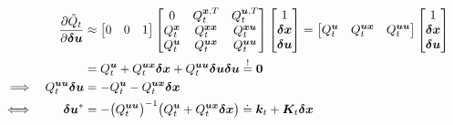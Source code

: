 			\begin{align}
				                  &           & \pdv{\tilde{Q}_t}{\bm{\delta u}}
				                  & \approx
				\begin{bmatrix}
					0 & 0 & 1
				\end{bmatrix}
				\begin{bmatrix}
					0             & Q_t^{\bm{x}, T}      & Q_t^{\bm{u}, T}      \\
					Q_t^{\bm{x}} & Q_t^{\bm{x} \bm{x}} & Q_t^{\bm{x} \bm{u}} \\
					Q_t^{\bm{u}} & Q_t^{\bm{u} \bm{x}} & Q_t^{\bm{u} \bm{u}}
				\end{bmatrix}
				\begin{bmatrix}
					1              \\
					\bm{\delta x} \\
					\bm{\delta u}
				\end{bmatrix}
				=
				\begin{bmatrix}
					Q_t^{\bm{u}} & Q_t^{\bm{u} \bm{x}} & Q_t^{\bm{u} \bm{u}}
				\end{bmatrix}
				\begin{bmatrix}
					1              \\
					\bm{\delta x} \\
					\bm{\delta u}
				\end{bmatrix} & \nonumber                                                                                                                                                                                                                                    \\
				                  &           &                                      & = Q_t^{\bm{u}} + Q_t^{\bm{u} \bm{x}} \bm{\delta x} + Q_t^{\bm{u} \bm{u}} \bm{\delta u} \bm{\delta u} \overset{!}{=} \bm{0}  \nonumber                                        \\
				\implies          &           & Q_t^{\bm{u} \bm{u}} \bm{\delta u} & = -Q_t^{\bm{u}} - Q_t^{\bm{u} \bm{x}} \bm{\delta x}                                                                                            & \nonumber                        \\
				\iff              &           & \bm{\delta u}^\ast                  & = -\big(Q_t^{\bm{u} \bm{u}}\big)^{-1} \big(Q_t^{\bm{u}} + Q_t^{\bm{u} \bm{x}} \bm{\delta x}\big) \doteq \bm{k}_t + \bm{K}_t \bm{\delta x} & \label{eq:ddpFeedbackControlLaw}
			\end{align}
